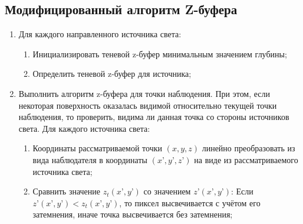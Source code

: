 \documentclass[a4paper,14pt]{extreport}
\begin{document}
\subsection{Модифицированный алгоритм Z-буфера}
\begin{enumerate}
\item Для каждого направленного источника света:
	\begin{enumerate}
	\item Инициализировать теневой z-буфер минимальным значением глубины;
	\item Определить теневой z-буфер для источника;
	\end{enumerate}
\item Выполнить алгоритм z-буфера для точки наблюдения. При этом, если
некоторая поверхность оказалась видимой относительно текущей точки
наблюдения, то проверить, видима ли данная точка со стороны источников
света. Для каждого источника света:
	\begin{enumerate}
	\item Координаты рассматриваемой точки \begin{math} (x, y, z) \end{math} линейно преобразовать из вида наблюдателя в координаты \begin{math} (x’, y’, z’) \end{math} на виде из рассматриваемого источника света;
	\item Сравнить значение \begin{math} z_t(x’, y’) \end{math} со значением \begin{math} z’(x’, y’) \end{math}: Если \begin{math} z’(x’, y’) < z_t(x’, y’)\end{math}, то пиксел высвечивается с учётом
его затемнения, иначе точка высвечивается без затемнения;
	\end{enumerate}
\end{enumerate} 
\end{document}

